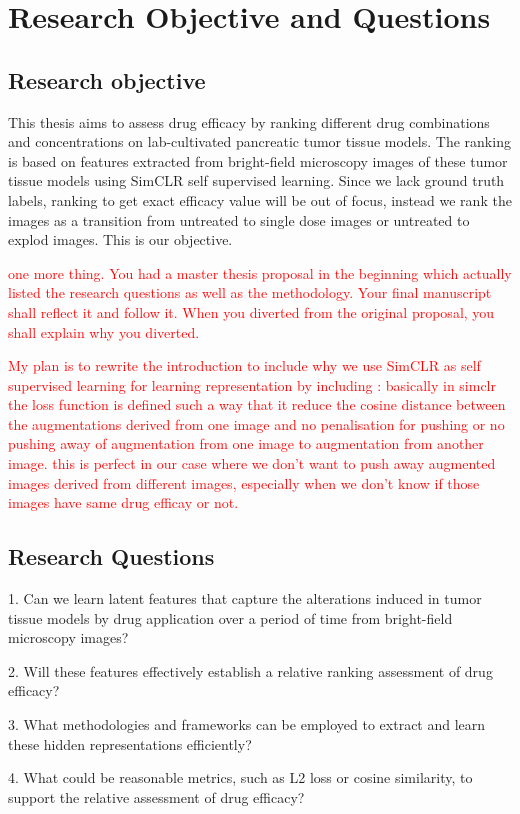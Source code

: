 \chapter{Research Objective and Questions}\label{ch:Research Objectives and Questions}
\section*{Research objective}
This thesis aims to assess drug efficacy by ranking different drug combinations and concentrations on lab-cultivated pancreatic tumor tissue models. 
The ranking is based on features extracted from bright-field microscopy images of these tumor tissue models using
SimCLR self supervised learning. Since we lack ground truth labels, ranking to get exact efficacy value will be out of focus, instead we rank the images as a transition from
 untreated to single dose images or untreated to explod images. This is our objective.  


 \textcolor{red}{one more thing. You had a master thesis proposal in the beginning which actually listed the research questions as well as the methodology. 
 Your final manuscript shall reflect it and follow it. When you diverted from the original proposal, you shall explain why you diverted.} 


\textcolor{red}{My plan is to rewrite the introduction to include why we use SimCLR as self supervised learning for learning representation by including :
 basically in simclr the loss function is defined such a way that it reduce the cosine distance between the augmentations derived from one image  and no 
 penalisation for pushing or no pushing away of augmentation from one image to augmentation from another image. this is perfect in our case where 
 we don't want to push away augmented images derived from different images, especially when we don't know if those images have same drug efficay or not.}

\section*{Research Questions}

1. Can we learn latent features that capture the alterations induced in tumor tissue models by drug application over a period of time from bright-field microscopy images?

2. Will these features effectively establish a relative ranking assessment of drug efficacy?

3. What methodologies and frameworks can be employed to extract and learn these hidden representations efficiently?

4. What could be reasonable metrics, such as L2 loss or cosine similarity, to support the relative assessment of drug efficacy?



